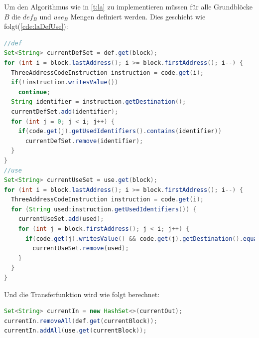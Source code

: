 \newpage
Um den Algorithmus wie in \cref{t:la} zu implementieren müssen für alle
Grundblöcke $B$ die $def_B$ und $use_B$ Mengen definiert werden.
Dies geschieht wie folgt(\cref{cde:laDefUse}):
\begin{lstlisting}[language=Java, caption={Berechnung der $def$ und $use$-Mengen}, label={cde:laDefUse}]
//def
Set<String> currentDefSet = def.get(block);
for (int i = block.lastAddress(); i >= block.firstAddress(); i--) {
  ThreeAddressCodeInstruction instruction = code.get(i);
  if(!instruction.writesValue())
    continue;
  String identifier = instruction.getDestination();
  currentDefSet.add(identifier);
  for (int j = 0; j < i; j++) {
    if(code.get(j).getUsedIdentifiers().contains(identifier))
      currentDefSet.remove(identifier);
  }
}
//use
Set<String> currentUseSet = use.get(block);
for (int i = block.lastAddress(); i >= block.firstAddress(); i--) {
  ThreeAddressCodeInstruction instruction = code.get(i);
  for (String used:instruction.getUsedIdentifiers()) {
    currentUseSet.add(used);
    for (int j = block.firstAddress(); j < i; j++) {
      if(code.get(j).writesValue() && code.get(j).getDestination().equals(used))
        currentUseSet.remove(used);
    }
  }
}
\end{lstlisting}
Und die Transferfunktion wird wie folgt berechnet:

\begin{lstlisting}[language=Java, caption={Berechnung der $out$-Menge}, label={cde:laOut}]
Set<String> currentIn = new HashSet<>(currentOut);
currentIn.removeAll(def.get(currentBlock));
currentIn.addAll(use.get(currentBlock));
\end{lstlisting}

\newpage
